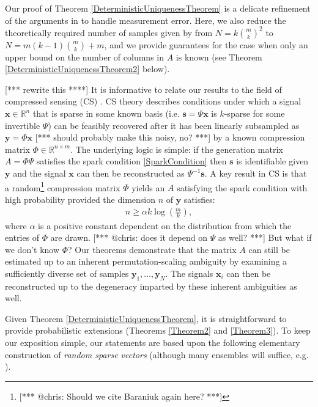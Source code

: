 \documentclass[journal, onecolumn]{IEEEtran}
\begin{document}
Our proof of Theorem \ref{DeterministicUniquenessTheorem} is a delicate refinement of the arguments in \cite{Hillar15} to handle measurement error.  Here, we also reduce the theoretically required number of samples given by \cite{Hillar15} from $N=k{m \choose k}^2$ to $N = m(k-1){m \choose k}+m$, and we provide guarantees for the case when only an upper bound on the number of columns in $A$ is known (see Theorem \ref{DeterministicUniquenessTheorem2} below). 

[*** rewrite this ****]
It is informative to relate our results to the field of compressed sensing (CS) \cite{candes2006near, donoho2006compressed, candes2006stable}. CS theory describes conditions under which a signal $\mathbf{x} \in \mathbb{R}^n$ that is sparse in some known basis (i.e. $\mathbf{s} = \Psi \mathbf{x}$ is $k$-sparse for some invertible $\Psi$) can be feasibly recovered after it has been linearly subsampled as $\mathbf{y} = \Phi \mathbf{x}$ [*** should probably make this noisy, no? ***] by a known compression matrix $\Phi \in \mathbb{R}^{n \times m}$. The underlying logic is simple: if the generation matrix $A = \Phi\Psi$ satisfies the spark condition \eqref{SparkCondition} then $\mathbf{s}$ is identifiable given $\mathbf{y}$ and the signal $\mathbf{x}$ can then be reconstructed as $\Psi^{-1}\mathbf{s}$. A key result in CS is that a random\footnote{[*** @chris: Should we cite Baraniuk again here? ***]} compression matrix $\Phi$ yields an $A$ satisfying the spark condition with high probability provided the dimension $n$ of $\mathbf{y}$ satisfies:
\begin{align}\label{CScondition}
n \geq \alpha k\log\left(\frac{m}{k}\right),
\end{align}
where $\alpha$ is a positive constant dependent on the distribution from which the entries of $\Phi$ are drawn. [*** @chris: does it depend on $\Psi$ as well? ***] But what if we don't know $\Phi$? Our theorems demonstrate that the matrix $A$ can still be estimated up to an inherent permutation-scaling ambiguity by examining a sufficiently diverse set of samples $\mathbf{y}_1, \ldots, \mathbf{y}_N$. The signals $\mathbf{x}_i$ can then be reconstructed up to the degeneracy imparted by these inherent ambiguities as well. 

Given Theorem \ref{DeterministicUniquenessTheorem}, it is straightforward to provide probabilistic extensions (Theorems \ref{Theorem2} and \ref{Theorem3}). To keep our exposition simple, our statements are based upon the following elementary construction of \emph{random sparse vectors} (although many ensembles will suffice, e.g. \cite[Sec.~\S 4]{baraniuk2008simple}).
\end{document}
